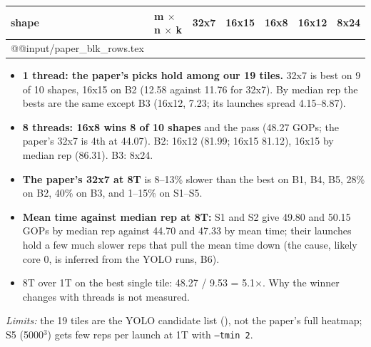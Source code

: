 \begin{center}\small
\begin{tabular}{@{}l l lllll@{}}
\toprule
shape & m $\times$ n $\times$ k & 32x7 & 16x15 & 16x8 & 16x12 & 8x24 \\
\midrule
\csname @@input\endcsname \D/paper_blk_rows.tex
\bottomrule
\end{tabular}
\end{center}

\begin{itemize}\setlength\itemsep{1pt}
\item \textbf{1 thread: the paper's picks hold among our 19 tiles.} 32x7 is best on 9 of 10 shapes, 16x15 on B2 (12.58 against 11.76 for 32x7). By median rep the bests are the same except B3 (16x12, 7.23; its launches spread 4.15--8.87).
\item \textbf{8 threads: 16x8 wins 8 of 10 shapes} and the pass (48.27 GOPs; the paper's 32x7 is 4th at 44.07). B2: 16x12 (81.99; 16x15 81.12), 16x15 by median rep (86.31). B3: 8x24.
\item \textbf{The paper's 32x7 at 8T} is 8--13\% slower than the best on B1, B4, B5, 28\% on B2, 40\% on B3, and 1--15\% on S1--S5.
\item \textbf{Mean time against median rep at 8T:} S1 and S2 give 49.80 and 50.15 GOPs by median rep against 44.70 and 47.33 by mean time; their launches hold a few much slower reps that pull the mean time down (the cause, likely core 0, is inferred from the YOLO runs,  B6).
\item 8T over 1T on the best single tile: 48.27 / 9.53 = 5.1$\times$. Why the winner changes with threads is not measured.
\end{itemize}
\noindent\textit{Limits:} the 19 tiles are the YOLO candidate list (), not the paper's full heatmap; S5 (5000$^3$) gets few reps per launch at 1T with \texttt{--tmin 2}.
